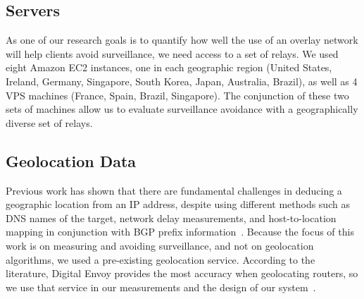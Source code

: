 \subsection{Servers}
As one of our research goals is to quantify how well the use of an overlay network will help clients avoid surveillance, we need access to a set of relays.  We used eight Amazon EC2 instances, one in each geographic region (United States, Ireland, Germany, Singapore, South Korea, Japan, Australia, Brazil), as well as 4 VPS machines (France, Spain, Brazil, Singapore).  The conjunction of these two sets of machines allow us to evaluate surveillance avoidance with a geographically diverse set of relays.

\subsection{Geolocation Data}
Previous work has shown that there are fundamental challenges in deducing a geographic location from an IP address, despite using different methods such as DNS names of the target, network delay measurements, and host-to-location mapping in conjunction with BGP prefix information~\cite{padmanabhan2001investigation}.  Because the focus of this work is on measuring and avoiding surveillance, and not on geolocation algorithms, we used a pre-existing geolocation service.  According to the literature, Digital Envoy provides the most accuracy when geolocating routers, so we use that service in our measurements and the design of our system~\cite{huffaker2011geocompare}. 
